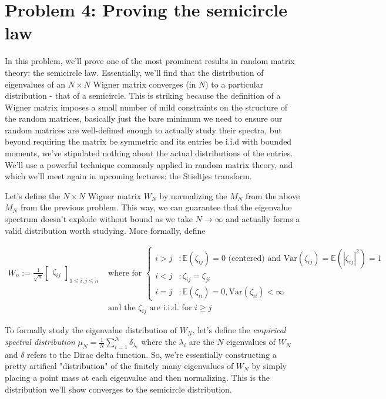 \documentclass[a4paper]{article}
\begin{document}
\section*{Problem 4: Proving the semicircle law}

In this problem, we'll prove one of the most prominent results in random matrix theory: the semicircle law. Essentially, we'll find that the distribution of eigenvalues of an $ N \times N $ Wigner matrix converges (in $ N $) to a particular distribution - that of a semicircle. This is striking because the definition of a Wigner matrix imposes a small number of mild constraints on the structure of the random matrices, basically just the bare minimum we need to ensure our random matrices are well-defined enough to actually study their spectra, but beyond requiring the matrix be symmetric and its entries be i.i.d with bounded moments, we've stipulated nothing about the actual distributions of the entries. We'll use a powerful technique commonly applied in random matrix theory, and which we'll meet again in upcoming lectures: the Stieltjes transform.

Let's define the $ N \times N $ Wigner matrix $ W_N $ by normalizing the $ M_N $ from the above $ M_N $ from the previous problem. This way, we can guarantee that the eigenvalue spectrum doesn't explode without bound as we take $ N \to \infty $ and actually forms a valid distribution worth studying. More formally, define

$$ \begin{aligned} W_n := \frac{1}{\sqrt{n}} \begin{bmatrix} \zeta_{ij} \end{bmatrix}_{1 \leq i, j \leq n} &\text{ where for } \begin{cases} i > j&: \mathbb{E}(\zeta_{ij}) = 0 \text{ (centered) and } \text{Var}(\zeta_{ij}) = \mathbb{E}(| \zeta_{ij} |^2) = 1 \\ i < j&: \zeta_{ij} = \zeta_{ji} \\ i = j&: \mathbb{E}(\zeta_{ii}) = 0, \text{Var}(\zeta_{ii}) < \infty \end{cases} \\ &\text{ and the } \zeta_{ij} \text{ are i.i.d. for } i \geq j \end{aligned} $$

To formally study the eigenvalue distribution of $ W_N $, let's define the \textit{empirical spectral distribution} $ \mu_N = \frac{1}{N} \sum_{i = 1}^N \delta_{\lambda_i} $ where the $ \lambda_i $ are the $ N $ eigenvalues of $ W_N $ and $ \delta $ refers to the Dirac delta function. So, we're essentially constructing a pretty artifical "distribution" of the finitely many eigenvalues of $ W_N $ by simply placing a point mass at each eigenvalue and then normalizing. This is the distribution we'll show converges to the semicircle distribution.
\end{document}
